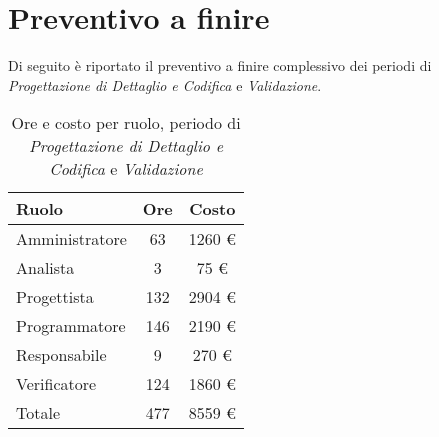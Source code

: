 \section{Preventivo a finire}
Di seguito è riportato il preventivo a finire complessivo dei periodi di \textit{Progettazione di Dettaglio e Codifica} e \textit{Validazione}.

\begin{table}[H]
	\centering
	\begin{tabular}{ l c c }
		\textbf{Ruolo} & \textbf{Ore} & \textbf{Costo} \\
		\hline
		Amministratore & 63 & 1260 \euro{} \\
		Analista & 3 & 75 \euro{} \\
		Progettista & 132 & 2904 \euro{} \\
		Programmatore & 146 & 2190 \euro{} \\
		Responsabile & 9 & 270 \euro{} \\
		Verificatore & 124 & 1860 \euro{} \\
		\hline
		Totale & 477 & 8559 \euro{} \\
		\hline
	\end{tabular}
	\caption{Ore e costo per ruolo, periodo di \textit{Progettazione di Dettaglio e Codifica} e \textit{Validazione}}
\end{table}

\newpage